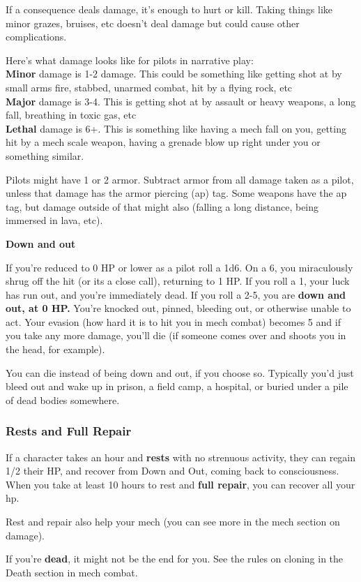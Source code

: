 If a consequence deals damage, it’s enough to hurt or kill. Taking things like minor grazes, bruises, etc doesn’t deal damage but could cause other complications.

Here’s what damage looks like for pilots in narrative play:\\
\textbf{Minor} damage is 1-2 damage. This could be something like getting shot at by small arms fire, stabbed, unarmed combat, hit by a flying rock, etc\\
\textbf{Major} damage is 3-4. This is getting shot at by assault or heavy weapons, a long fall, breathing in toxic gas, etc\\
\textbf{Lethal} damage is 6+. This is something like having a mech fall on you, getting hit by a mech scale weapon, having a grenade blow up right under you or something similar.

Pilots might have 1 or 2 armor. Subtract armor from all damage taken as a pilot, unless that damage has the armor piercing (ap) tag. Some weapons have the ap tag, but damage outside of that might also (falling a long distance, being immersed in lava, etc).

                                                \textbf{Down and out} 

If you’re reduced to 0 HP or lower as a pilot roll a 1d6. On a 6, you miraculously shrug off the hit (or its a close call), returning to 1 HP. If you roll a 1, your luck has run out, and you’re immediately dead. If you roll a 2-5, you are \textbf{down and out, at 0 HP.} You’re knocked out, pinned, bleeding out, or otherwise unable to act. Your evasion (how hard it is to hit you in mech combat) becomes 5 and if you take any more damage, you’ll die (if someone comes over and shoots you in the head, for example).

You can die instead of being down and out, if you choose so. Typically you’d just bleed out and wake up in prison, a field camp, a hospital, or buried under a pile of dead bodies somewhere.

\subsubsection{Rests and Full Repair}

If a character takes an hour and \textbf{rests} with no strenuous activity, they can regain 1/2 their HP, and recover from Down and Out, coming back to consciousness. When you take at least 10 hours to rest and \textbf{full repair}, you can recover all your hp. 

Rest and repair also help your mech (you can see more in the mech section on damage). 

If you’re \textbf{dead}, it might not be the end for you. See the rules on cloning in the Death section in mech combat.